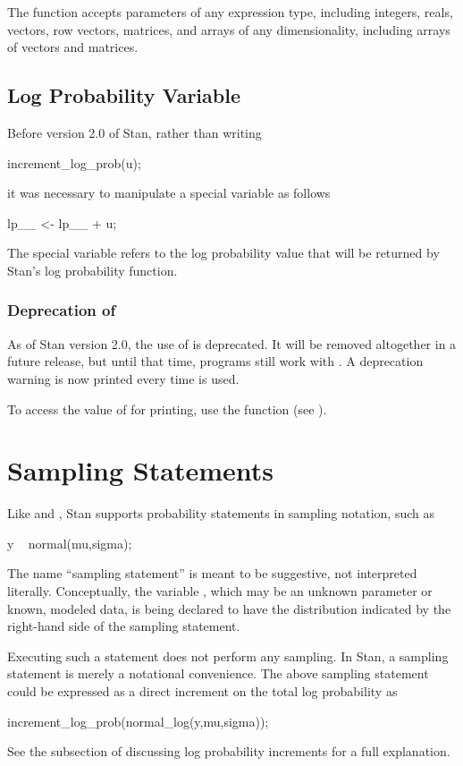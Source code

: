 The  function accepts parameters of any
expression type, including integers, reals, vectors, row vectors,
matrices, and arrays of any dimensionality, including arrays of
vectors and matrices.

\subsection{Log Probability Variable }

Before version 2.0 of Stan, rather than writing
%
\begin{stancode}
increment_log_prob(u);
\end{stancode}
%
it was necessary to manipulate a special variable 
as follows
%
\begin{stancode}
lp__ <- lp__ + u;
\end{stancode}
%
The special variable  refers to the log probability value
that will be returned by Stan's log probability function.

\subsubsection{Deprecation of }

As of Stan version 2.0, the use of  is deprecated.  It
will be removed altogether in a future release, but until that time,
programs still work with .  A deprecation warning is now
printed every time  is used.

To access the value of  for printing, use the
 function (see ).


\section{Sampling Statements}\label{sampling-statements.section}

Like \BUGS and \JAGS, Stan supports probability statements in
sampling notation, such as
%
\begin{stancode}
y ~ normal(mu,sigma);
\end{stancode}
%
The name ``sampling statement'' is meant to be suggestive, not
interpreted literally.  Conceptually, the variable , which may
be an unknown parameter or known, modeled data, is being declared
to have the distribution indicated by the right-hand side of the
sampling statement.

Executing such a statement does not perform any sampling.  In Stan, a
sampling statement is merely a notational convenience.  The above
sampling statement could be expressed as a direct increment on the
total log probability as
%
\begin{stancode}
increment_log_prob(normal_log(y,mu,sigma));
\end{stancode}
%
See the subsection of  discussing log
probability increments for a full explanation.

